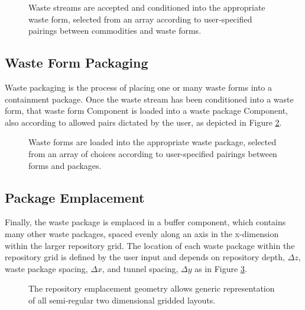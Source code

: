 \begin{figure}[htbp!]
\begin{center}
\def\svgwidth{.5\textwidth}

\end{center}
\caption[Waste stream conditioning in \Cyder.]{Waste streams are accepted and 
conditioned into the appropriate waste form, selected from an array according to 
user-specified pairings between commodities and waste forms.} 
\label{fig:ws_conditioning}
\end{figure}

\subsection{Waste Form Packaging}

Waste packaging is the process of placing one or many waste forms into a 
containment package. Once the waste stream has been 
conditioned into a waste form, that waste form Component is loaded into a waste 
package Component, also according to allowed pairs dictated by the user, as 
depicted in Figure \ref{fig:wf_packaging}.

\begin{figure}[htbp!]
\begin{center}
\def\svgwidth{.5\textwidth}

\end{center}
\caption[Waste packaging in \Cyder.]{Waste forms are loaded into the appropriate 
waste package, selected from an array of choices according to user-specified 
pairings between forms and packages.} 
\label{fig:wf_packaging}
\end{figure}


\subsection{Package Emplacement}

Finally, the waste package is emplaced in a buffer component, which contains 
many other waste packages, spaced evenly along an axis in the x-dimension 
within the larger repository grid. The location of each waste package within 
the repository grid is defined by the user input and depends on repository 
depth, $\Delta z$, waste package spacing, $\Delta x$, and tunnel spacing, 
$\Delta y$ as in Figure \ref{fig:repo_layout}.

\begin{figure}[htbp!]
\begin{center}
\def\svgwidth{.5\textwidth}

\end{center}
\caption[The gridded \Cyder repository emplacement geometry.]{The \Cyder 
repository emplacement geometry allows generic representation of all semi-regular 
two dimensional gridded layouts.}
\label{fig:repo_layout}
\end{figure}

